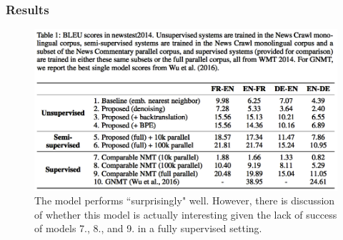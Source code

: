\documentclass{beamer}
\begin{document}
\begin{frame}
\frametitle{Results}
 \begin{figure}
  \centering
  \includegraphics[width=.9\textwidth]{pres_imgs/unsupresults}
  \caption{\label{fig:unsupresults} The model performs ``surprisingly" well. However, there is discussion of whether this model is actually interesting given the lack of success of models 7., 8., and 9. in a fully supervised setting.}
\end{figure}
\end{frame}
\end{document}
